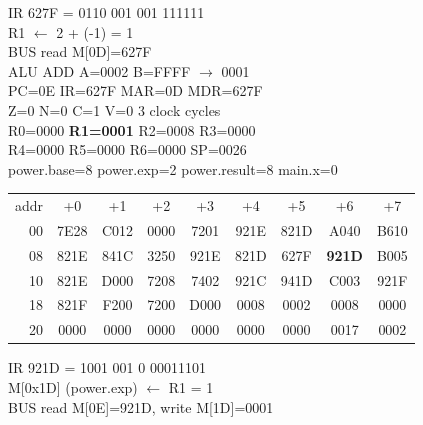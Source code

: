 \noindent\begin{tcolorbox}[stepbox, title={Step 18 \hfill PC 0D \quad ADDI R1, R1, -1}]
\textcolor{dim}{IR} 627F = 0110 001 001 111111\\
R1 $\leftarrow$ 2 + (-1) = 1\\
\textcolor{dim}{BUS} read M[0D]=627F\\
\textcolor{dim}{ALU} ADD A=0002 B=FFFF $\rightarrow$ 0001\\
PC=0E IR=627F MAR=0D MDR=627F\\
Z=0 N=0 C=1 V=0 \hfill \textcolor{dim}{3 clock cycles}\\
R0=0000 \textcolor{wrt}{\textbf{R1=0001}} R2=0008 R3=0000\\
R4=0000 R5=0000 R6=0000 SP=0026\\
\textcolor{dim}{power.base=8  power.exp=2  power.result=8  main.x=0}\\[1pt]
{\setlength{\tabcolsep}{1.6pt}\begin{tabular}{@{}r*{8}{c}@{}}
\textcolor{dim}{addr} & \textcolor{dim}{+0} & \textcolor{dim}{+1} & \textcolor{dim}{+2} & \textcolor{dim}{+3} & \textcolor{dim}{+4} & \textcolor{dim}{+5} & \textcolor{dim}{+6} & \textcolor{dim}{+7}\\
\textcolor{dim}{00} & 7E28 & C012 & 0000 & 7201 & 921E & 821D & A040 & B610\\
\textcolor{dim}{08} & 821E & 841C & 3250 & 921E & 821D & 627F & \cellcolor{pcc}\textbf{921D} & B005\\
\textcolor{dim}{10} & 821E & D000 & 7208 & 7402 & 921C & 941D & C003 & 921F\\
\textcolor{dim}{18} & 821F & F200 & 7200 & D000 & \cellcolor{datac}0008 & \cellcolor{datac}0002 & \cellcolor{datac}0008 & \cellcolor{datac}0000\\
\textcolor{dim}{20} & \cellcolor{stackc}0000 & \cellcolor{stackc}0000 & \cellcolor{stackc}0000 & \cellcolor{stackc}0000 & \cellcolor{stackc}0000 & \cellcolor{stackc}0000 & \cellcolor{stackc}0017 & \cellcolor{stackc}0002\\
\end{tabular}}
\end{tcolorbox}\hfill\begin{tcolorbox}[stepbox, title={Step 19 \hfill PC 0E \quad ST R1, power.exp}]
\textcolor{dim}{IR} 921D = 1001 001 0 00011101\\
M[0x1D] (power.exp) $\leftarrow$ R1 = 1\\
\textcolor{dim}{BUS} read M[0E]=921D, \textcolor{wrt}{write M[1D]=0001}\\

\end{tcolorbox}
